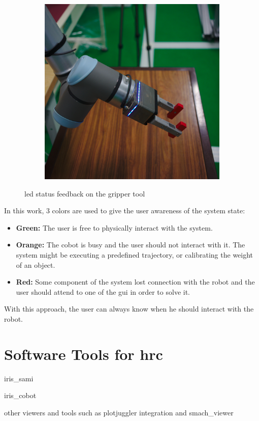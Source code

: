 \begin{figure}[h]
\begin{subfigure}{.2\linewidth}
    \end{subfigure}%
    \begin{subfigure}{.2\linewidth}
        \centering
        \includegraphics[width=.95\linewidth]{figs/chp5/grip_blue.jpg}
    \end{subfigure}
    \caption{\ac{led} status feedback on the gripper tool}
    \label{fig:gripper_leds}
\end{figure}

\par In this work, 3 colors are used to give the user awareness of the system state:

\begin{itemize}
    \item \textbf{Green: } The user is free to physically interact with the system.
    \item \textbf{Orange: } The cobot is busy and the user should not interact with it. The system might be executing a predefined trajectory, or calibrating the weight of an object.
    \item \textbf{Red: } Some component of the system lost connection with the robot and the user should attend to one of the \ac{gui} in order to solve it.
\end{itemize}

\par With this approach, the user can always know when he should interact with the robot.


\section{Software Tools for \ac{hrc}}
\label{sec:tools-hrc}


\par iris\_sami
\par iris\_cobot
\par other viewers and tools such as plotjuggler integration and smach\_viewer
